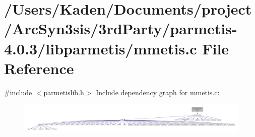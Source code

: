 \hypertarget{a00374}{}\section{/\+Users/\+Kaden/\+Documents/project/\+Arc\+Syn3sis/3rd\+Party/parmetis-\/4.0.3/libparmetis/mmetis.c File Reference}
\label{a00374}
{\ttfamily \#include $<$parmetislib.\+h$>$}\newline
Include dependency graph for mmetis.\+c\+:\nopagebreak
\begin{figure}[H]
\begin{center}
\leavevmode
\includegraphics[width=350pt]{a00375}
\end{center}
\end{figure}
